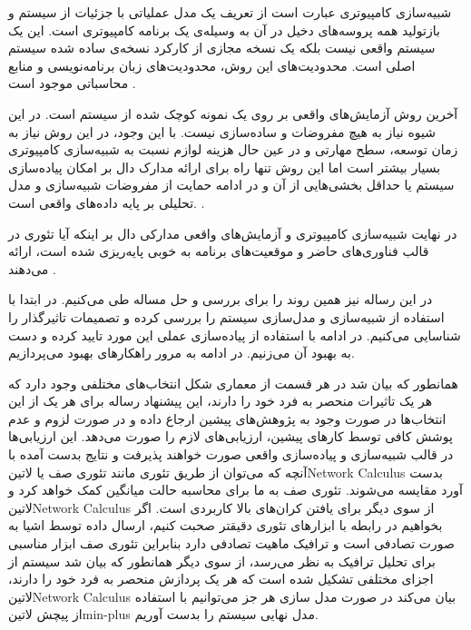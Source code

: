 شبیه‌سازی کامپیوتری عبارت است از تعریف یک مدل عملیاتی با جزئیات از سیستم و بازتولید
همه پروسه‌های دخیل در آن به وسیله‌ی یک برنامه کامپیوتری است.
این یک سیستم واقعی نیست بلکه یک نسخه مجازی از کارکرد نسخه‌ی ساده شده سیستم اصلی است.
محدودیت‌های این روش، محدودیت‌های زبان برنامه‌نویسی و منابع محاسباتی موجود است
.

آخرین روش آزمایش‌های واقعی بر روی یک نمونه کوچک شده از سیستم است.
در این شیوه نیاز به هیچ مفروضات و ساده‌سازی نیست.
با این وجود، در این روش نیاز به زمان توسعه، سطح مهارتی و در عین حال هزینه لوازم نسبت به شبیه‌سازی کامپیوتری بسیار بیشتر است
اما این روش تنها راه برای ارائه مدارک دال بر امکان پیاده‌سازی سیستم یا حداقل بخشی‌هایی از آن و در ادامه حمایت از مفروضات شبیه‌سازی
و مدل تحلیلی بر پایه داده‌های واقعی است.
.

در نهایت شبیه‌سازی کامپیوتری و آزمایش‌های واقعی مدارکی دال بر اینکه آیا تئوری در قالب فناوری‌های حاضر و موقعیت‌های برنامه
به خوبی پایه‌ریزی شده است، ارائه می‌دهند
.

در این رساله نیز همین روند را برای بررسی و حل مساله طی می‌کنیم. در ابتدا با استفاده از شبیه‌سازی و مدل‌سازی سیستم را بررسی کرده
و تصمیمات تاثیرگذار را شناسایی می‌کنیم. در ادامه با استفاده از پیاده‌سازی عملی این مورد تایید کرده و دست به بهبود آن می‌زنیم.
در ادامه به مرور راهکارهای بهبود می‌پردازیم.

همانطور که بیان شد در هر قسمت از معماری شکل  انتخاب‌های مختلفی وجود دارد که هر یک تاثیرات منحصر به فرد خود را دارند،
این پیشنهاد رساله برای هر یک از این انتخاب‌ها در صورت وجود به پژوهش‌های پیشین ارجاع داده و در صورت لزوم و عدم پوشش کافی توسط کارهای پیشین، ارزیابی‌های لازم را صورت می‌دهد.
این ارزیابی‌ها در قالب شبیه‌سازی و پیاده‌سازی واقعی صورت خواهند پذیرفت و نتایج بدست آمده با آنچه که می‌توان از طریق تئوری مانند تئوری صف یا ‌لاتین{Network Calculus}
بدست آورد مقایسه می‌شوند. تئوری صف به ما برای محاسبه حالت میانگین کمک خواهد کرد و ‌لاتین{Network Calculus} از سوی دیگر برای یافتن کران‌های بالا کاربردی است.
اگر بخواهیم در رابطه با ابزارهای تئوری دقیقتر صحبت کنیم، ارسال داده توسط اشیا به صورت تصادفی است و ترافیک ماهیت تصادفی دارد بنابراین تئوری صف ابزار مناسبی برای تحلیل ترافیک به نظر می‌رسد،
از سوی دیگر همانطور که بیان شد سیستم از اجزای مختلفی تشکیل شده است که هر یک پردازش منحصر به فرد خود را دارند، ‌لاتین{Network Calculus} بیان می‌کند در صورت مدل سازی هر جز
می‌توانیم با استفاده از پیچش ‌لاتین{min-plus} مدل نهایی سیستم را بدست آوریم.


